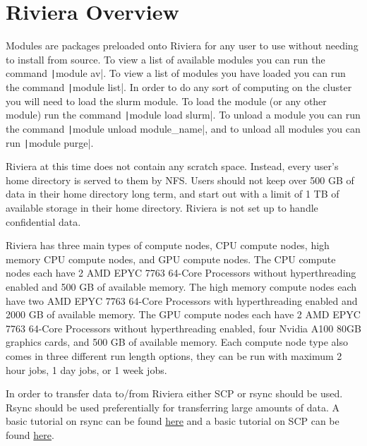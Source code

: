 \documentclass[11pt,letterpaper]{article}
\begin{document}
\section{Riviera Overview}
\begin{description}[noitemsep]
    \item[Modules] Modules are packages preloaded onto Riviera for any user to use without needing to install from source. To view a list of available modules you can run the command \texttt|module av|. To view a list of modules you have loaded you can run the command \texttt|module list|. In order to do any sort of computing on the cluster you will need to load the slurm module. To load the module (or any other module) run the command \texttt|module load slurm|. To unload a module you can run the command \texttt|module unload module_name|, and to unload all modules you can run \texttt|module purge|.
    \item[Space] Riviera at this time does not contain any scratch space. Instead, every user's home directory is served to them by NFS. Users should not keep over 500 GB of data in their home directory long term, and start out with a limit of 1 TB of available storage in their home directory. Riviera is not set up to handle confidential data.
    \item[Available Resources] Riviera has three main types of compute nodes, CPU compute nodes, high memory CPU compute nodes, and GPU compute nodes. The CPU compute nodes each have 2 AMD EPYC 7763 64-Core Processors without hyperthreading enabled and 500 GB of available memory. The high memory compute nodes each have two AMD EPYC 7763 64-Core Processors with hyperthreading enabled and 2000 GB of available memory. The GPU compute nodes each have 2 AMD EPYC 7763 64-Core Processors without hyperthreading enabled, four Nvidia A100 80GB graphics cards, and 500 GB of available memory. Each compute node type also comes in three different run length options, they can be run with maximum 2 hour jobs, 1 day jobs, or 1 week jobs.
    \item[Data Transfer] In order to transfer data to/from Riviera either SCP or rsync should be used. Rsync should be used preferentially for transferring large amounts of data. A basic tutorial on rsync can be found \href{https://linuxize.com/post/how-to-use-rsync-for-local-and-remote-data-transfer-and-synchronization/}{here} and a basic tutorial on SCP can be found \href{https://linuxize.com/post/how-to-use-scp-command-to-securely-transfer-files/}{here}.

\end{description}
\end{document}
